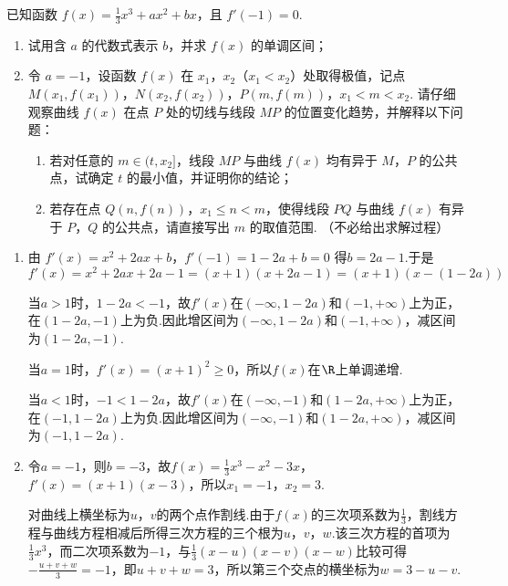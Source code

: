 \begin{problem}
已知函数 \( f(x) = \frac{1}{3} x^3 + ax^2 + bx \)，且 \( f'(-1) = 0 \).

\begin{enumerate}
\item 试用含 \(a\) 的代数式表示 \(b\)，并求 \(f(x)\) 的单调区间；
\item 令 \(a = -1\)，设函数 \(f(x)\) 在 \(x_1\)，\(x_2\)（\(x_1 < x_2\)）处取得极值，记点 \(M(x_1, f(x_1))\)，\(N(x_2, f(x_2))\)，\(P(m, f(m))\)，\(x_1 < m < x_2\). 请仔细观察曲线 \(f(x)\) 在点 \(P\) 处的切线与线段 \(MP\) 的位置变化趋势，并解释以下问题：

\begin{enumerate}
\item 若对任意的 \(m \in (t, x_2]\)，线段 \(MP\) 与曲线 \(f(x)\) 均有异于 \(M\)，\(P\) 的公共点，试确定 \(t\) 的最小值，并证明你的结论；
\item 若存在点 \(Q(n, f(n))\)，\(x_1 \leqslant n < m\)，使得线段 \(PQ\) 与曲线 \(f(x)\) 有异于 \(P\)，\(Q\) 的公共点，请直接写出 \(m\) 的取值范围. （不必给出求解过程）
\end{enumerate}
\end{enumerate}

\begin{solution}
\begin{enumerate}
\item 由
\(f'(x)=x^2+2ax+b\)，\(f'(-1)=1-2a+b=0\)
得\(b=2a-1\).于是
\[
f'(x)=x^2+2ax+2a-1=(x+1)(x+2a-1)=(x+1)(x-(1-2a))
\]

当\(a>1\)时，\(1-2a<-1\)，故\(f'(x)\)在\((-\infty,1-2a)\)和\((-1,+\infty)\)上为正，在\((1-2a,-1)\)上为负.因此增区间为\((-\infty,1-2a)\)和\((-1,+\infty)\)，减区间为\((1-2a,-1)\).

当\(a=1\)时，\(f'(x)=(x+1)^2\geqslant0\)，所以\(f(x)\)在\(\R\)上单调递增.

当\(a<1\)时，\(-1<1-2a\)，故\(f'(x)\)在\((-\infty,-1)\)和\((1-2a,+\infty)\)上为正，在\((-1,1-2a)\)上为负.因此增区间为\((-\infty,-1)\)和\((1-2a,+\infty)\)，减区间为\((-1,1-2a)\).

\item 令\(a=-1\)，则\(b=-3\)，故\(f(x)=\frac{1}{3}x^3-x^2-3x\)，\(f'(x)=(x+1)(x-3)\)，所以\(x_1=-1\)，\(x_2=3\).

对曲线上横坐标为\(u\)，\(v\)的两个点作割线.由于\(f(x)\)的三次项系数为\(\frac{1}{3}\)，割线方程与曲线方程相减后所得三次方程的三个根为\(u\)，\(v\)，\(w\).该三次方程的首项为\(\frac{1}{3}x^3\)，而二次项系数为\(-1\)，与\(\frac{1}{3}(x-u)(x-v)(x-w)\)比较可得\(-\frac{u+v+w}{3}=-1\)，即\(u+v+w=3\)，所以第三个交点的横坐标为\(w=3-u-v\).


\end{enumerate}
\end{solution}
\end{problem}
